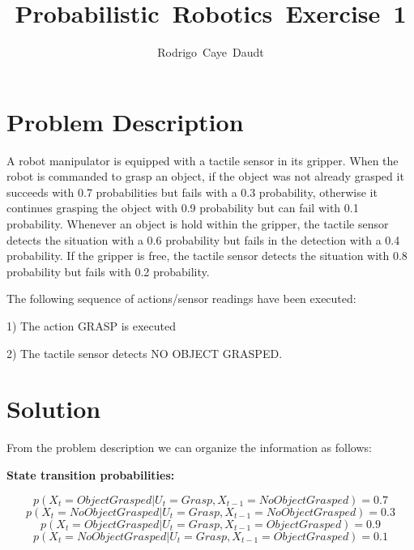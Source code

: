 \documentclass{article}
\begin{document}
\title{Probabilistic~Robotics~Exercise~1}
%

\author{Rodrigo~Caye~Daudt}





\maketitle



\section{Problem Description}

A robot manipulator is equipped with a tactile sensor in its gripper. When the robot is commanded to grasp an object, if the object was not already grasped it succeeds with 0.7 probabilities but fails with a 0.3 probability, otherwise it continues grasping the object with 0.9 probability but can fail with 0.1 probability.
Whenever an object is hold within the gripper, the tactile sensor detects the situation with a 0.6 probability but fails in the detection with a 0.4 probability.
If the gripper is free, the tactile sensor detects the situation with 0.8 probability but fails with 0.2 probability.

The following sequence of actions/sensor readings have been executed:

1) The action GRASP is executed

2) The tactile sensor detects NO OBJECT GRASPED.

\section{Solution}

From the problem description we can organize the information as follows:

\textbf{State transition probabilities:}

\[
p(X_t=ObjectGrasped|U_t=Grasp, X_{t-1}=NoObjectGrasped) = 0.7
\]
\[
p(X_t=NoObjectGrasped|U_t=Grasp, X_{t-1}=NoObjectGrasped) = 0.3
\]
\[
p(X_t=ObjectGrasped|U_t=Grasp, X_{t-1}=ObjectGrasped) = 0.9
\]
\[
p(X_t=NoObjectGrasped|U_t=Grasp, X_{t-1}=ObjectGrasped) = 0.1
\]
\end{document}
